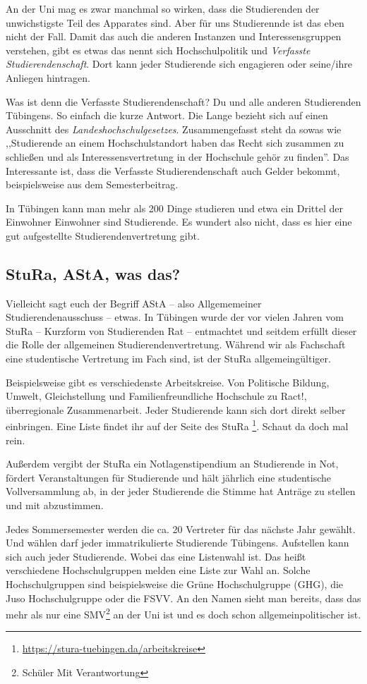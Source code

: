 An der Uni mag es zwar manchmal so wirken, dass die Studierenden der unwichstigste
Teil des Apparates sind.
Aber für uns Studierennde ist das eben nicht der Fall.
Damit das auch die anderen Instanzen und Interessensgruppen verstehen, gibt es
etwas das nennt sich Hochschulpolitik und \textit{Verfasste
Studierendenschaft}. Dort kann jeder Studierende sich engagieren oder seine/ihre
Anliegen hintragen.

Was ist denn die Verfasste Studierendenschaft? Du und alle anderen Studierenden
Tübingens. So einfach die kurze Antwort. Die Lange bezieht sich auf einen
Ausschnitt des \textit{Landeshochschulgesetzes}.  Zusammengefasst steht da
sowas wie ,,Studierende an einem Hochschulstandort haben das Recht sich zusammen
zu schließen und als Interessensvertretung in der Hochschule gehör zu finden''.
Das Interessante ist, dass die Verfasste Studierendenschaft auch Gelder bekommt,
beispielsweise aus dem Semesterbeitrag.

In Tübingen kann man mehr als 200 Dinge studieren und etwa ein Drittel der
Einwohner Einwohner sind Studierende. Es wundert also nicht, dass es hier eine
gut aufgestellte Studierendenvertretung gibt.


\subsection{StuRa, AStA, was das?}

Vielleicht sagt euch der Begriff AStA -- also Allgememeiner
Studierendenausschuss -- etwas. In Tübingen wurde der vor vielen Jahren vom
StuRa -- Kurzform von Studierenden Rat -- entmachtet und seitdem erfüllt dieser
die Rolle der allgemeinen Studierendenvertretung. Während wir als Fachschaft
eine studentische Vertretung im Fach sind, ist der StuRa allgemeingültiger.

Beispielsweise gibt es verschiedenste Arbeitskreise. Von Politische Bildung,
Umwelt, Gleichstellung und Familienfreundliche Hochschule zu Ract!, überregionale
Zusammenarbeit. Jeder Studierende kann sich dort direkt selber einbringen.
Eine Liste findet ihr auf der Seite des StuRa
\footnote{\url{https://stura-tuebingen.da/arbeitskreise}}. Schaut da doch mal
rein.

Außerdem vergibt der StuRa ein Notlagenstipendium an Studierende in Not, fördert
Veranstaltungen für Studierende und hält jährlich eine studentische Vollversammlung
ab, in der jeder Studierende die Stimme hat Anträge zu stellen und mit abzustimmen.

Jedes Sommersemester werden die ca. 20 Vertreter für das nächste Jahr gewählt.
Und wählen darf jeder immatrikulierte Studierende Tübingens. Aufstellen kann sich
auch jeder Studierende. Wobei das eine Listenwahl ist. Das heißt verschiedene
Hochschulgruppen melden eine Liste zur Wahl an. Solche Hochschulgruppen
sind beispielsweise die Grüne Hochschulgruppe (GHG), die Juso Hochschulgruppe
oder die FSVV. An den Namen sieht man bereits, dass das mehr als nur eine
SMV\footnote{Schüler Mit Verantwortung} an der Uni ist und es doch schon
allgemeinpolitischer ist.


